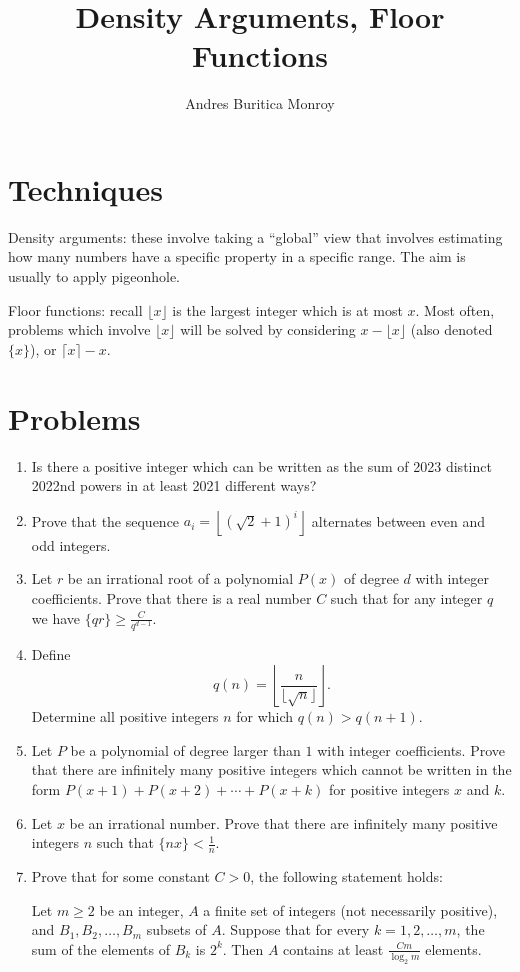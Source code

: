 \documentclass{article}
\title{Density Arguments, Floor Functions}
\author{Andres Buritica Monroy}
\date{}
\begin{document}
\maketitle
\section{Techniques}
  Density arguments: these involve taking a ``global'' view that involves
  estimating how many numbers have a specific property in a specific range.
  The aim is usually to apply pigeonhole.

  Floor functions: recall $\lfloor x\rfloor$ is the largest integer which is at
  most $x$. Most often, problems which involve $\lfloor x\rfloor$ will be
  solved by considering $x-\lfloor x\rfloor$ (also denoted $\{x\}$), or $\lceil
  x\rceil-x$.
\section{Problems}
\begin{enumerate}
  \item Is there a positive integer which can be written as the sum of 2023
    distinct 2022nd powers in at least 2021 different ways?
  \item Prove that the sequence $a_i=\left\lfloor(\sqrt 2+1)^i\right\rfloor$
    alternates between even and odd integers.
  \item Let $r$ be an irrational root of a polynomial $P(x)$ of degree $d$ with
    integer coefficients. Prove that there is a real number $C$ such that for
    any integer $q$ we have $\{qr\}\ge \frac C{q^{d-1}}$.
  \item Define
    \[q(n)=\left\lfloor\frac n{\lfloor\sqrt n\rfloor}\right\rfloor.\]
    Determine all positive integers $n$ for which $q(n)>q(n+1)$.
  \item Let $P$ be a polynomial of degree larger than $1$ with integer
    coefficients. Prove that there are infinitely many positive integers which cannot be
    written in the form $P(x+1)+P(x+2)+\cdots+P(x+k)$ for positive integers $x$
    and $k$.
  \item Let $x$ be an irrational number. Prove that there are infinitely many
    positive integers $n$ such that $\{nx\}<\frac 1n$.
  \item Prove that for some constant $C>0$, the following statement holds:

    Let $m\ge 2$ be an integer, $A$ a finite set of integers (not
    necessarily positive), and $B_1,B_2,\ldots,B_m$ subsets of $A$. Suppose
    that for every $k=1,2,\ldots,m$, the sum of the elements of $B_k$ is
    $2^k$. Then $A$ contains at least $\frac {Cm}{\log_2 m}$ elements.
\end{enumerate}
\newpage
\end{document}
